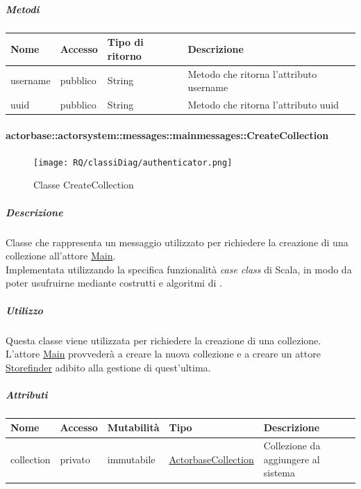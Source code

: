 \documentclass{scalatekids-article}
\begin{document}
\subparagraph{Metodi}
\begin{tabular}{| l | l | l | l |}
  \hline
  Nome & Accesso & Tipo di ritorno & Descrizione\\
  \hline
  username & pubblico & String & Metodo che ritorna l'attributo username\\
  \hline
  uuid & pubblico & String & Metodo che ritorna l'attributo uuid\\
  \hline
\end{tabular}

\paragraph{actorbase::actorsystem::messages::mainmessages::CreateCollection}
\label{sec:actorbase::actorsystem::messages::mainmessages::CreateCollection}

\begin{figure}[H]
  \begin{center}
    \texttt{[image: RQ/classiDiag/authenticator.png]}
    \caption{Classe CreateCollection}
  \end{center}
\end{figure}

\subparagraph{Descrizione}
Classe che rappresenta un messaggio utilizzato per richiedere la creazione di una collezione all'attore \hyperref[sec:actorbase::actorsystem::actors::main::Main]{Main}.\\Implementata
utilizzando la specifica funzionalità \textit{case class} di Scala, in modo da poter usufruirne mediante costrutti e algoritmi di
.

\subparagraph{Utilizzo}
Questa classe viene utilizzata per richiedere la creazione di una collezione.\\L'attore
\hyperref[sec:actorbase::actorsystem::actors::main::Main]{Main} provvederà a creare la nuova collezione e a creare un attore \hyperref[sec:actorbase::actorsystem::actors::storefinder::Storefinder]{Storefinder}
adibito alla gestione di quest'ultima.

\subparagraph{Attributi}
\begin{tabular}{| p{2cm} | p{1.5cm} | p{2cm} | p{3cm} | p{8.5cm} |}
  \hline
  Nome & Accesso & Mutabilità & Tipo & Descrizione\\
  \hline
  collection & privato & immutabile & \hyperref[sec:actorbase::actorsystem::utils::ActorbaseCollection]{ActorbaseCollection} & Collezione da aggiungere al sistema\\
  \hline
\end{tabular}
\end{document}

